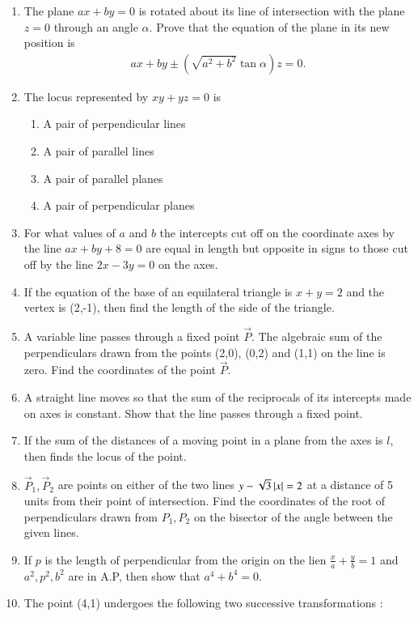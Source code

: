 \begin{enumerate}[label=\thesubsection.\arabic*,ref=\thesubsection.\theenumi]
\item The plane $ax+by=0$ is rotated about its line of intersection with the plane $z=0$ through an angle $\alpha.$ Prove that the equation of the plane in its new position is 
\begin{align*}
	ax+by \pm (\sqrt{a^2+b^2} \tan\alpha)z=0.
\end{align*}
\item The locus represented by $xy+yz=0$ is 
\begin{enumerate}
	\item A pair of perpendicular lines
	\item A pair of parallel lines
	\item A pair of parallel planes 
	\item A pair of perpendicular planes
\end{enumerate}
\item For what values of $a$ and $b$ the intercepts cut off on the coordinate axes by the line $ax+by+8=0$ are equal in length but opposite in signs to those cut off by the line $2x-3y=0$ on the axes.
\item If the equation of the base of an equilateral triangle is $x+y=2$ and the vertex is (2,-1), then find the length of the side of the triangle. 
\item A variable line passes through a fixed point $\vec{P}$. The algebraic sum of the perpendiculars drawn from the points (2,0), (0,2) and (1,1) on the line is zero. Find the coordinates of the point $\vec{P}$.  
\item A straight line moves so that the sum of the reciprocals of its intercepts made on axes is constant. Show that the line passes through a fixed point. 
\item If the sum of the distances of a moving point in a plane from the axes is $l$, then finds the locus of the point.  
\item $\vec{P}_1,\vec{P}_2$ are points on either of the two lines $y-\sqrt{3}\left\vert x\right\vert=2$ at a distance of 5 units from their point of intersection. Find the coordinates of the root of perpendiculars drawn from $P_1, P_2$ on the bisector of the angle between the given lines.
\item If $p$ is the length of perpendicular from the origin on the lien $\frac{x}{a}+\frac{y}{b}=1$ and $a^2,p^2,b^2$ are in A.P, then show that $a^4+b^4=0$.
\item The point (4,1) undergoes the following two successive transformations :
\begin{enumerate}

\end{enumerate}
\end{enumerate}
